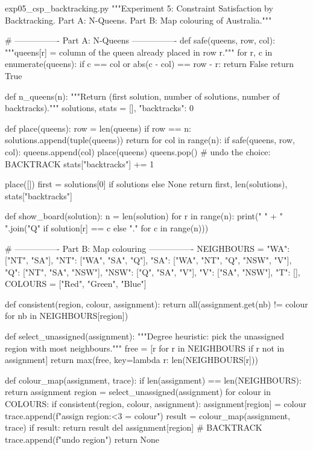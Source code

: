 \documentclass[11pt,a4paper]{article}
\begin{document}
\begin{pycode}{exp05\_csp\_backtracking.py}
"""Experiment 5: Constraint Satisfaction by Backtracking.
Part A: N-Queens.   Part B: Map colouring of Australia."""


# ---------------- Part A: N-Queens ----------------
def safe(queens, row, col):
    """queens[r] = column of the queen already placed in row r."""
    for r, c in enumerate(queens):
        if c == col or abs(c - col) == row - r:
            return False
    return True


def n_queens(n):
    """Return (first solution, number of solutions, number of backtracks)."""
    solutions, stats = [], {"backtracks": 0}

    def place(queens):
        row = len(queens)
        if row == n:
            solutions.append(tuple(queens))
            return
        for col in range(n):
            if safe(queens, row, col):
                queens.append(col)
                place(queens)
                queens.pop()                 # undo the choice: BACKTRACK
                stats["backtracks"] += 1

    place([])
    first = solutions[0] if solutions else None
    return first, len(solutions), stats["backtracks"]


def show_board(solution):
    n = len(solution)
    for r in range(n):
        print("   " + " ".join("Q" if solution[r] == c else "." for c in range(n)))


# ---------------- Part B: Map colouring ----------------
NEIGHBOURS = {
    "WA": ["NT", "SA"],
    "NT": ["WA", "SA", "Q"],
    "SA": ["WA", "NT", "Q", "NSW", "V"],
    "Q": ["NT", "SA", "NSW"],
    "NSW": ["Q", "SA", "V"],
    "V": ["SA", "NSW"],
    "T": [],
}
COLOURS = ["Red", "Green", "Blue"]


def consistent(region, colour, assignment):
    return all(assignment.get(nb) != colour for nb in NEIGHBOURS[region])


def select_unassigned(assignment):
    """Degree heuristic: pick the unassigned region with most neighbours."""
    free = [r for r in NEIGHBOURS if r not in assignment]
    return max(free, key=lambda r: len(NEIGHBOURS[r]))


def colour_map(assignment, trace):
    if len(assignment) == len(NEIGHBOURS):
        return assignment
    region = select_unassigned(assignment)
    for colour in COLOURS:
        if consistent(region, colour, assignment):
            assignment[region] = colour
            trace.append(f"assign {region:<3} = {colour}")
            result = colour_map(assignment, trace)
            if result:
                return result
            del assignment[region]           # BACKTRACK
            trace.append(f"undo   {region}")
    return None



\end{pycode}
\end{document}
